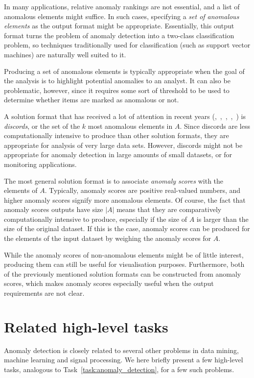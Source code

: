 In many applications, relative anomaly rankings are not essential, and a list of anomalous elements might suffice. In such cases, specifying a \emph{set of anomalous elements} as the output format might be appropriate. Essentially, this output format turns the problem of anomaly detection into a two-class classification problem, so techniques traditionally used for classification (such as support vector machines) are naturally well suited to it.

Producing a set of anomalous elements is typically appropriate when the goal of the analysis is to highlight potential anomalies to an analyst. It can also be problematic, however, since it requires some sort of threshold to be used to determine whether items are marked as anomalous or not.

A solution format that has received a lot of attention in recent years (\cite{keogh1},~\cite{bu},~\cite{yankov},~\cite{fu},~\cite{lin}) is \emph{discords}, or the set of the $k$ most anomalous elements in $A$. Since discords are less computationally intensive to produce than other solution formats, they are appropriate for analysis of very large data sets. However, discords might not be appropriate for anomaly detection in large amounts of small datasets, or for monitoring applications.

The most general solution format is to associate \emph{anomaly scores} with the elements of $A$. Typically, anomaly scores are positive real-valued numbers, and higher anomaly scores signify more anomalous elements. Of course, the fact that anomaly scores outputs have size $|A|$ means that they are comparatively computationally intensive to produce, especially if the size of $A$ is larger than the size of the original dataset. If this is the case, anomaly scores can be produced for the elements of the input dataset by weighing the anomaly scores for $A$.

While the anomaly scores of non-anomalous elements might be of little interest, producing them can still be useful for visualisation purposes. Furthermore, both of the previously mentioned solution formats can be constructed from anomaly scores, which makes anomaly scores especially useful when the output requirements are not clear.

\section{Related high-level tasks}
\label{sect:related_tasks}

Anomaly detection is closely related to several other problems in data mining, machine learning and signal processing. We here briefly present a few high-level tasks, analogous to Task~\ref{task:anomaly_detection}, for a few such problems.

